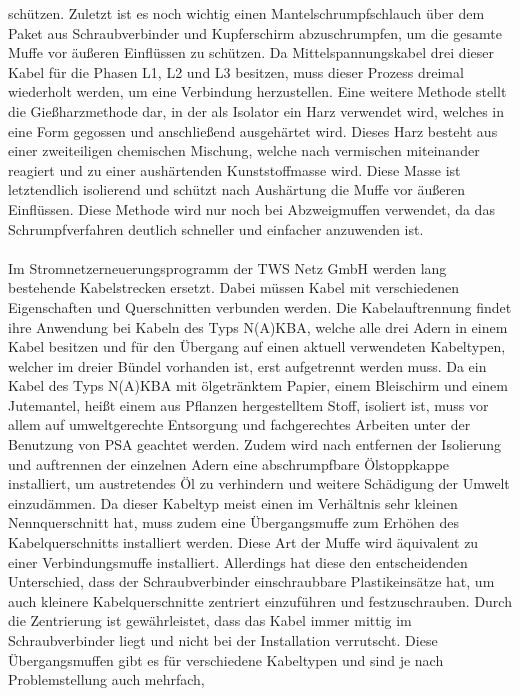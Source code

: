 schützen. Zuletzt ist es noch wichtig einen Mantelschrumpfschlauch über dem Paket aus Schraubverbinder und Kupferschirm abzuschrumpfen, um die gesamte Muffe 
vor äußeren Einflüssen zu schützen. Da Mittelspannungskabel drei dieser Kabel für die Phasen L1, L2 und L3 besitzen, muss dieser Prozess dreimal wiederholt 
werden, um eine Verbindung herzustellen. Eine weitere Methode stellt die Gießharzmethode dar, in der als Isolator ein Harz verwendet wird, welches in eine Form 
gegossen und anschließend ausgehärtet wird. Dieses Harz besteht aus einer zweiteiligen chemischen Mischung, welche nach vermischen miteinander reagiert und 
zu einer aushärtenden Kunststoffmasse wird. Diese Masse ist letztendlich isolierend und schützt nach Aushärtung die Muffe vor äußeren Einflüssen. Diese Methode 
wird nur noch bei Abzweigmuffen verwendet, da das Schrumpfverfahren deutlich schneller und einfacher anzuwenden ist. \autocite{Cellpack}
\\\\
Im Stromnetzerneuerungsprogramm der TWS Netz GmbH werden lang bestehende Kabelstrecken ersetzt. Dabei müssen Kabel mit verschiedenen Eigenschaften und 
Querschnitten verbunden werden. 
Die Kabelauftrennung findet ihre Anwendung bei Kabeln des Typs N(A)KBA, welche alle drei Adern in einem Kabel besitzen und für den Übergang auf einen aktuell 
verwendeten Kabeltypen, welcher im dreier Bündel vorhanden ist, erst aufgetrennt werden muss. Da ein Kabel des Typs N(A)KBA mit ölgetränktem Papier, einem 
Bleischirm und einem Jutemantel, heißt einem aus Pflanzen hergestelltem Stoff, isoliert ist, muss vor allem auf umweltgerechte Entsorgung und fachgerechtes 
Arbeiten unter der Benutzung von PSA geachtet werden. Zudem wird nach entfernen der Isolierung und auftrennen der einzelnen Adern eine abschrumpfbare 
Ölstoppkappe installiert, um austretendes Öl zu verhindern und weitere Schädigung der Umwelt einzudämmen. Da dieser Kabeltyp meist einen im Verhältnis sehr 
kleinen Nennquerschnitt hat, muss zudem eine Übergangsmuffe zum Erhöhen des Kabelquerschnitts installiert werden. Diese Art der Muffe wird äquivalent zu 
einer Verbindungsmuffe installiert. Allerdings hat diese den entscheidenden Unterschied, dass der Schraubverbinder einschraubbare Plastikeinsätze hat, um auch 
kleinere Kabelquerschnitte zentriert einzuführen und festzuschrauben. Durch die Zentrierung ist gewährleistet, dass das Kabel immer mittig im Schraubverbinder 
liegt und nicht bei der Installation verrutscht. Diese Übergangsmuffen gibt es für verschiedene Kabeltypen und sind je nach Problemstellung auch mehrfach, \zB 
